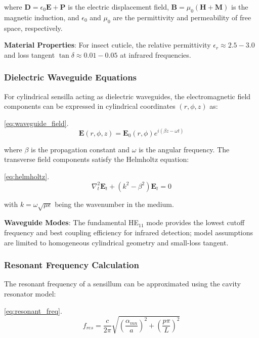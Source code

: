 \documentclass[
  13pt,
  a4paperpaper,
  12pt]{article}
\begin{document}
where \(\mathbf{D} = \epsilon_0 \mathbf{E} + \mathbf{P}\) is the
electric displacement field,
\(\mathbf{B} = \mu_0(\mathbf{H} + \mathbf{M})\) is the magnetic
induction, and \(\epsilon_0\) and \(\mu_0\) are the permittivity and
permeability of free space, respectively.

\textbf{Material Properties}: For insect cuticle, the relative
permittivity \(\epsilon_r \approx 2.5-3.0\) and loss tangent
\(\tan \delta \approx 0.01-0.05\) at infrared frequencies.

\subsubsection{Dielectric Waveguide
Equations}\label{dielectric-waveguide-equations}

For cylindrical sensilla acting as dielectric waveguides, the
electromagnetic field components can be expressed in cylindrical
coordinates \((r, \phi, z)\) as:

\eqref{eq:waveguide_field}. \begin{equation}
\mathbf{E}(r, \phi, z) = \mathbf{E}_0(r, \phi) e^{i(\beta z - \omega t)} \label{eq:waveguide_field}
\end{equation}

where \(\beta\) is the propagation constant and \(\omega\) is the
angular frequency. The transverse field components satisfy the Helmholtz
equation:

\eqref{eq:helmholtz}. \begin{equation}
\nabla_t^2 \mathbf{E}_t + (k^2 - \beta^2)\mathbf{E}_t = 0 \label{eq:helmholtz}
\end{equation}

with \(k = \omega \sqrt{\mu \epsilon}\) being the wavenumber in the
medium.

\textbf{Waveguide Modes}: The fundamental HE\(_{11}\) mode provides the
lowest cutoff frequency and best coupling efficiency for infrared
detection; model assumptions are limited to homogeneous cylindrical
geometry and small-loss tangent.

\subsubsection{Resonant Frequency
Calculation}\label{resonant-frequency-calculation}

The resonant frequency of a sensillum can be approximated using the
cavity resonator model:

\eqref{eq:resonant_freq}. \begin{equation}
f_{res} = \frac{c}{2\pi} \sqrt{\left(\frac{\alpha_{mn}}{a}\right)^2 + \left(\frac{p\pi}{L}\right)^2} \label{eq:resonant_freq}
\end{equation}
\end{document}
